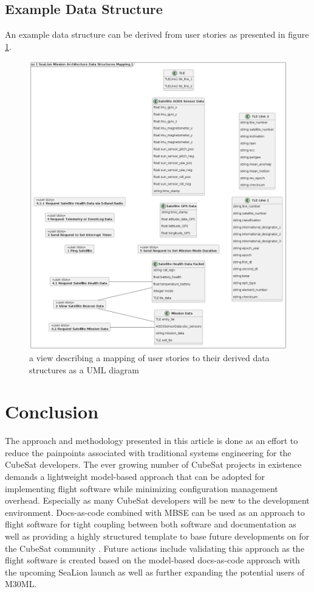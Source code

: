 \documentclass[conf]{new-aiaa}
\begin{document}
\subsection{Example Data Structure}

An example data structure can be derived from user stories as presented in figure \ref{data-structures-mapping}.

\begin{figure}[hbt!]
    \centering
    \includegraphics[width=.5\textwidth]{data-structures-mapping}
    \caption{a view describing a mapping of user stories to their derived data structures as a UML diagram}
    \label{data-structures-mapping}
\end{figure}


\section{Conclusion}

The approach and methodology presented in this article is done as an effort to reduce the painpoints associated with traditional systems engineering for the CubeSat developers. The ever growing number of CubeSat projects in existence demands a lightweight model-based approach that can be adopted for implementing flight software while minimizing configuration management overhead. Especially as many CubeSat developers will be new to the development environment. Docs-as-code combined with MBSE can be used as an approach to flight software for tight coupling between both software and documentation as well as providing a highly structured template to base future developments on for the CubeSat community \cite{sealion_mission_architecture}. Future actions include validating this approach as the flight software is created based on the model-based docs-as-code approach with the upcoming SeaLion launch as well as further expanding the potential users of M30ML.




\end{document}
